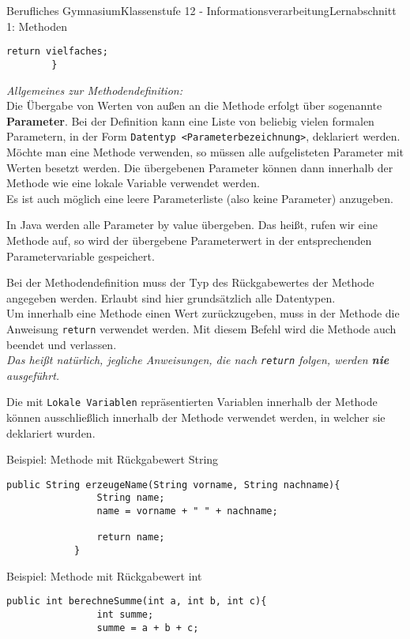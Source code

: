 \documentclass[11pt,oneside,openany,headings=optiontotoc,11pt,numbers=noenddot]{article}
\begin{document}
\begin{worksheet}{Berufliches Gymnasium}{Klassenstufe 12 - Informationsverarbeitung}{Lernabschnitt 1: Methoden}
\begin{lstlisting}[style=JavaInputStyle]
			return vielfaches;
		}
		\end{lstlisting}
		\textit{Allgemeines zur Methodendefinition:}\\
		Die Übergabe von Werten \grqq{}von außen\grqq{} an die Methode erfolgt über sogenannte \textbf{Parameter}. Bei der Definition kann eine Liste von beliebig vielen formalen Parametern, in der Form \lstinline[style=JavaInputStyle]|Datentyp <Parameterbezeichnung>|, deklariert werden. Möchte man eine Methode verwenden, so müssen alle aufgelisteten Parameter mit Werten besetzt werden. Die übergebenen Parameter können dann innerhalb der Methode wie eine lokale Variable verwendet werden.\\
		Es ist auch möglich eine leere Parameterliste (also keine Parameter) anzugeben.\\
		\par\noindent
		In Java werden alle Parameter \glqq{}by value\grqq{} übergeben. Das heißt, rufen wir eine Methode auf, so wird der übergebene Parameterwert in der entsprechenden Parametervariable gespeichert.\\
		\par\noindent
		Bei der Methodendefinition muss der Typ des Rückgabewertes der Methode angegeben werden. Erlaubt sind hier grundsätzlich alle Datentypen.\\
		Um innerhalb eine Methode einen Wert zurückzugeben, muss in der Methode die Anweisung \lstinline[style=JavaInputStyle]|return| verwendet werden. Mit diesem Befehl wird die Methode auch beendet und verlassen.\\
		\textit{Das heißt natürlich, jegliche Anweisungen, die nach \lstinline[style=JavaInputStyle]|return| folgen, werden \textbf{nie} ausgeführt.}\\
		\par\noindent
		Die mit \lstinline[style=JavaInputStyle]|Lokale Variablen| repräsentierten Variablen innerhalb der Methode können ausschließlich innerhalb der Methode verwendet werden, in welcher sie deklariert wurden.\\
		\begin{minipage}[t]{0.48\textwidth}
			\vspace*{0pt}
			Beispiel: Methode mit Rückgabewert String
			\begin{lstlisting}[style=JavaInputStyle,frame=single]
			public String erzeugeName(String vorname, String nachname){
				String name;
				name = vorname + " " + nachname;
				
				return name;
			}
			\end{lstlisting}
		\end{minipage}
		\hfill
		\begin{minipage}[t]{0.48\textwidth}
			\vspace*{0pt}
			Beispiel: Methode mit Rückgabewert int
			\begin{lstlisting}[style=JavaInputStyle,frame=single]
			public int berechneSumme(int a, int b, int c){
				int summe;
				summe = a + b + c;
			

\end{lstlisting}
\end{minipage}
\end{worksheet}
\end{document}

